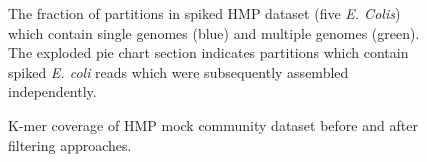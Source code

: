 \documentclass[11pt]{article} %
\begin{document}
\begin{figure}[ht]
\caption{The fraction of partitions in spiked HMP dataset (five \emph{E. Colis}) which contain single genomes (blue) and multiple genomes (green).  The exploded pie chart section indicates partitions which contain spiked \emph{E. coli} reads which were subsequently assembled independently. }
\label{ecolimap2}
\end{figure}


\begin{figure}[ht]
\caption{  K-mer coverage of HMP mock community dataset before and after filtering approaches.}
\label{kmercoverage}
\end{figure}
\end{document}
